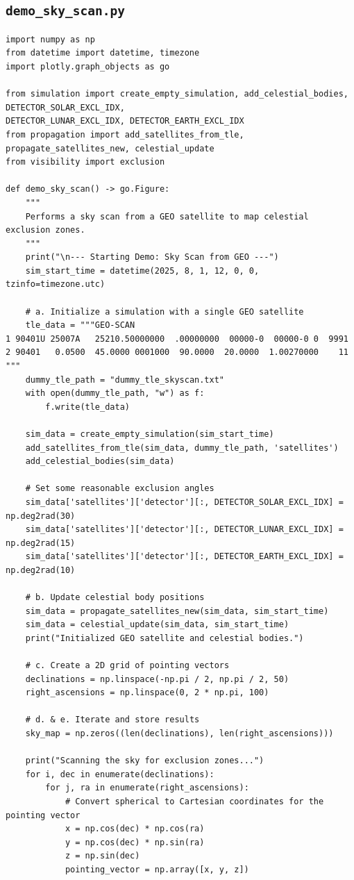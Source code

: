 \documentclass[11pt]{article}
\begin{document}
\subsection{\texttt{demo\_sky\_scan.py}}
\begin{Verbatim}
import numpy as np
from datetime import datetime, timezone
import plotly.graph_objects as go

from simulation import create_empty_simulation, add_celestial_bodies, DETECTOR_SOLAR_EXCL_IDX,
DETECTOR_LUNAR_EXCL_IDX, DETECTOR_EARTH_EXCL_IDX
from propagation import add_satellites_from_tle, propagate_satellites_new, celestial_update
from visibility import exclusion

def demo_sky_scan() -> go.Figure:
    """
    Performs a sky scan from a GEO satellite to map celestial exclusion zones.
    """
    print("\n--- Starting Demo: Sky Scan from GEO ---")
    sim_start_time = datetime(2025, 8, 1, 12, 0, 0, tzinfo=timezone.utc)

    # a. Initialize a simulation with a single GEO satellite
    tle_data = """GEO-SCAN
1 90401U 25007A   25210.50000000  .00000000  00000-0  00000-0 0  9991
2 90401   0.0500  45.0000 0001000  90.0000  20.0000  1.00270000    11
"""
    dummy_tle_path = "dummy_tle_skyscan.txt"
    with open(dummy_tle_path, "w") as f:
        f.write(tle_data)

    sim_data = create_empty_simulation(sim_start_time)
    add_satellites_from_tle(sim_data, dummy_tle_path, 'satellites')
    add_celestial_bodies(sim_data)

    # Set some reasonable exclusion angles
    sim_data['satellites']['detector'][:, DETECTOR_SOLAR_EXCL_IDX] = np.deg2rad(30)
    sim_data['satellites']['detector'][:, DETECTOR_LUNAR_EXCL_IDX] = np.deg2rad(15)
    sim_data['satellites']['detector'][:, DETECTOR_EARTH_EXCL_IDX] = np.deg2rad(10)

    # b. Update celestial body positions
    sim_data = propagate_satellites_new(sim_data, sim_start_time)
    sim_data = celestial_update(sim_data, sim_start_time)
    print("Initialized GEO satellite and celestial bodies.")

    # c. Create a 2D grid of pointing vectors
    declinations = np.linspace(-np.pi / 2, np.pi / 2, 50)
    right_ascensions = np.linspace(0, 2 * np.pi, 100)

    # d. & e. Iterate and store results
    sky_map = np.zeros((len(declinations), len(right_ascensions)))

    print("Scanning the sky for exclusion zones...")
    for i, dec in enumerate(declinations):
        for j, ra in enumerate(right_ascensions):
            # Convert spherical to Cartesian coordinates for the pointing vector
            x = np.cos(dec) * np.cos(ra)
            y = np.cos(dec) * np.sin(ra)
            z = np.sin(dec)
            pointing_vector = np.array([x, y, z])


\end{Verbatim}
\end{document}
